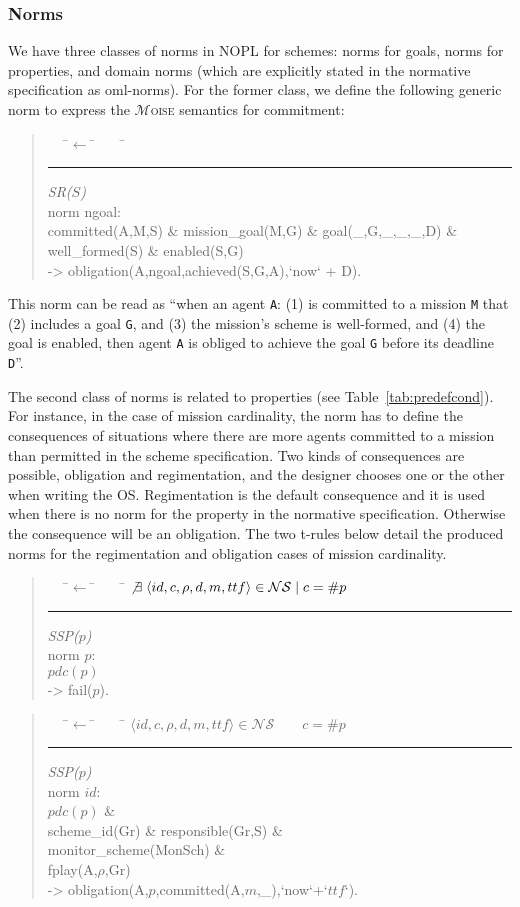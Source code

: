 \documentclass{article}
\newcommand{\moise}{{$\mathcal{M}$\textsc{oise}}\xspace}
\newcommand{\st}{\mid}
\newcommand{\set}[1]{\mathcal{#1}}
\newcommand{\andalso}{\quad\quad}
\newcommand{\code}[1]{\texttt{#1}}
\newenvironment{rwrule}[2]
{\begin{quote}\ttfamily\begin{tabbing}~~~\=$\leftarrow$ \= ~~~ \= \kill
     \ensuremath{#2}\\
     \rule[2pt]{6.5cm}{.3pt} \hfill \rwlabel{#1}\\}
{\end{tabbing}\end{quote}}
\newcommand{\rwlabel}[1]{{\scshape\itshape\textrm{#1}}}
\theoremstyle{definition} \newtheorem{definition}{Definition}
\begin{document}
\subsubsection{Norms}


We have three classes of norms in NOPL for schemes: norms for goals,
norms for properties, and domain norms (which are explicitly stated in
the normative specification as oml-norms).  For the former class, we
define the following generic norm to express the \moise semantics for
commitment:

\begin{rwrule}{SR($S$)}
{}
norm ngoal:\\
\>\>    committed(A,M,S) \& mission\_goal(M,G) \& goal(\_,G,\_,\_,\_,D) \&\\
\>\>    well\_formed(S) \& enabled(S,G) \\
-> obligation(A,ngoal,achieved(S,G,A),`now` + D).
\end{rwrule}

This norm can be read as ``when an agent \code{A}: (1) is committed
to a mission \code{M} that (2) includes a goal \code{G}, and (3) the mission's
scheme is well-formed, and (4) the goal is enabled, then agent \code{A} is
obliged to achieve the goal \code{G} before its deadline \code{D}''.

The second class of norms is related to properties (see
Table~\ref{tab:predefcond}).  For instance, in the case of mission
cardinality, the norm has to define the consequences of situations
where there are more agents committed to a mission than permitted in
the scheme specification. Two kinds of consequences are possible,
obligation and regimentation, and the designer chooses one or the
other when writing the OS.  Regimentation is the default consequence
and it is used when there is no norm for the property in the normative
specification. Otherwise the consequence will be an obligation.  The
two t-rules below detail the produced norms for the regimentation and
obligation cases of mission cardinality.

\begin{rwrule}{SSP($p$)}
  {\not \exists \; \langle id, c, \rho, d, m, ttf \rangle \in \set{NS} \st  c = \#p}
  norm $p$: \\
  \> \>         $pdc(p)$\\
  \>   -> \> fail($p$).
\end{rwrule}

\begin{rwrule}{SSP($p$)}
  {\langle id, c, \rho, d, m, ttf \rangle \in \set{NS} \andalso c = \#p}
  norm $id$: \\
  \> \> $pdc(p)$ \& \\
  \> \> scheme\_id(Gr) \& responsible(Gr,S) \& \\
  \> \> monitor\_scheme(MonSch) \& \\
  \> \> fplay(A,$\rho$,Gr) \\
-> \> obligation(A,$p$,committed(A,$m$,\_),`now`+`$ttf$`).
\end{rwrule}
\end{document}
